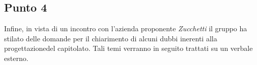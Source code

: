     \subsection{Punto 4}
        Infine, in vista di un incontro con l'azienda proponente \textit{Zucchetti} il gruppo ha stilato delle domande per il chiarimento di alcuni dubbi inerenti alla progettazione\glosp del capitolato\glo. Tali temi verranno in seguito trattati su un verbale esterno.
